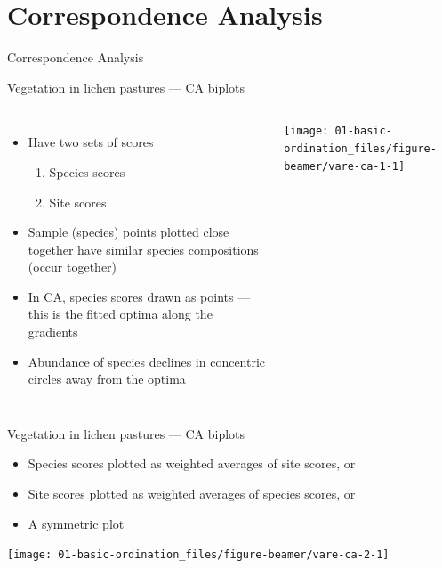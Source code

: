 \documentclass[10pt,ignorenonframetext,compress, aspectratio=169]{beamer}
\providecommand{\tightlist}{%
  \setlength{\itemsep}{0pt}\setlength{\parskip}{0pt}}
\newcommand{\columnsbegin}{\begin{columns}}
\newcommand{\columnsend}{\end{columns}}
\begin{document}
\section{Correspondence Analysis}\label{correspondence-analysis}

\begin{frame}{Correspondence Analysis}

\end{frame}

\begin{frame}{Vegetation in lichen pastures --- CA biplots}

\columnsbegin
{}

\begin{itemize}
\tightlist
\item
  Have two sets of scores

  \begin{enumerate}
  \def\labelenumi{\arabic{enumi}.}
  \tightlist
  \item
    Species scores
  \item
    Site scores
  \end{enumerate}
\item
  Sample (species) points plotted close together have similar species
  compositions (occur together)
\item
  In CA, species scores drawn as points --- this is the fitted optima
  along the gradients
\item
  Abundance of species declines in concentric circles away from the
  optima
\end{itemize}


\begin{center}\texttt{[image: 01-basic-ordination\_files/figure-beamer/vare-ca-1-1]} \end{center}

\columnsend

\end{frame}

\begin{frame}{Vegetation in lichen pastures --- CA biplots}

\begin{itemize}
\tightlist
\item
  Species scores plotted as weighted averages of site scores, or
\item
  Site scores plotted as weighted averages of species scores, or
\item
  A symmetric plot
\end{itemize}

\begin{center}\texttt{[image: 01-basic-ordination\_files/figure-beamer/vare-ca-2-1]} \end{center}

\end{frame}
\end{document}
